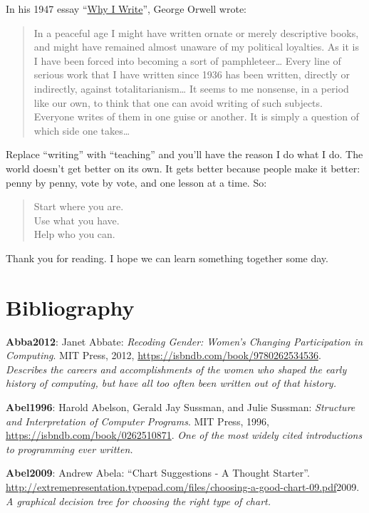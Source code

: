 In his 1947 essay ``\href{http://www.resort.com/~prime8/Orwell/whywrite.html}{Why I Write}'', George Orwell wrote:

\begin{quote}\setlength{\parindent}{0pt}
In a peaceful age I might have written ornate or merely descriptive
books, and might have remained almost unaware of my political
loyalties. As it is I have been forced into becoming a sort of
pamphleteer\ldots{} Every line of serious work that I have
written since 1936 has been written, directly or indirectly, against
totalitarianism\ldots{} It seems to me nonsense, in a period
like our own, to think that one can avoid writing of such subjects.
Everyone writes of them in one guise or another. It is simply a
question of which side one takes\ldots{}
\end{quote}

Replace ``writing'' with ``teaching'' and you'll have the reason I do what I
do. The world doesn't get better on its own. It gets better because
people make it better: penny by penny, vote by vote, and one lesson at a
time. So:

\begin{quote}\setlength{\parindent}{0pt}
Start where you are.\\
Use what you have.\\
Help who you can.
\end{quote}

Thank you for reading. I hope we can learn something together some day.

\chapter{Bibliography}\label{s:bib}

\textbf{\hypertarget{b:Abba2012}{Abba2012}\label{b:Abba2012}}: Janet Abbate: \emph{Recoding Gender: Women's Changing Participation in Computing}. MIT Press, 2012, \url{https://isbndb.com/book/9780262534536}. \emph{Describes the careers and accomplishments of the women who shaped the early history of computing, but have all too often been written out of that history.}

\textbf{\hypertarget{b:Abel1996}{Abel1996}\label{b:Abel1996}}: Harold Abelson, Gerald Jay Sussman, and Julie Sussman: \emph{Structure and Interpretation of Computer Programs}. MIT Press, 1996, \url{https://isbndb.com/book/0262510871}. \emph{One of the most widely cited introductions to programming ever written.}

\textbf{\hypertarget{b:Abel2009}{Abel2009}\label{b:Abel2009}}: Andrew Abela: ``Chart Suggestions - A Thought Starter''. \url{http://extremepresentation.typepad.com/files/choosing-a-good-chart-09.pdf}2009. \emph{A graphical decision tree for choosing the right type of chart.}

